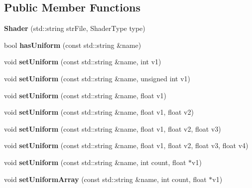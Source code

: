 \subsection*{Public Member Functions}
\begin{DoxyCompactItemize}
\item 
{\bfseries Shader} (std\-::string str\-File, Shader\-Type type)\label{classSoundfieldViewer_1_1Shader_a390d6f60d961f4d6c714001f451c5374}

\item 
bool {\bfseries has\-Uniform} (const std\-::string \&name)\label{classSoundfieldViewer_1_1Shader_a94f4ce9e6cc94fc71bf44917d83de4c7}

\item 
void {\bfseries set\-Uniform} (const std\-::string \&name, int v1)\label{classSoundfieldViewer_1_1Shader_a049541011f6117f85577dbc09bc2f9c6}

\item 
void {\bfseries set\-Uniform} (const std\-::string \&name, unsigned int v1)\label{classSoundfieldViewer_1_1Shader_a774b085f2575550279c59dfcae1bd72d}

\item 
void {\bfseries set\-Uniform} (const std\-::string \&name, float v1)\label{classSoundfieldViewer_1_1Shader_a9ba4d6dc369f93bab255c92c0a9704ff}

\item 
void {\bfseries set\-Uniform} (const std\-::string \&name, float v1, float v2)\label{classSoundfieldViewer_1_1Shader_a770c993b645a8b5722e695960d3b1765}

\item 
void {\bfseries set\-Uniform} (const std\-::string \&name, float v1, float v2, float v3)\label{classSoundfieldViewer_1_1Shader_aae60997bca2222ca10696d59f7454d39}

\item 
void {\bfseries set\-Uniform} (const std\-::string \&name, float v1, float v2, float v3, float v4)\label{classSoundfieldViewer_1_1Shader_a0d8548d3311dc14404478399060c9921}

\item 
void {\bfseries set\-Uniform} (const std\-::string \&name, int count, float $\ast$v1)\label{classSoundfieldViewer_1_1Shader_a00085101a6d91fc7c1e561b129c66e30}

\item 
void {\bfseries set\-Uniform\-Array} (const std\-::string \&name, int count, float $\ast$v1)\label{classSoundfieldViewer_1_1Shader_aba38c7d8e68ef91369754300dbb22c30}


\end{DoxyCompactItemize}
